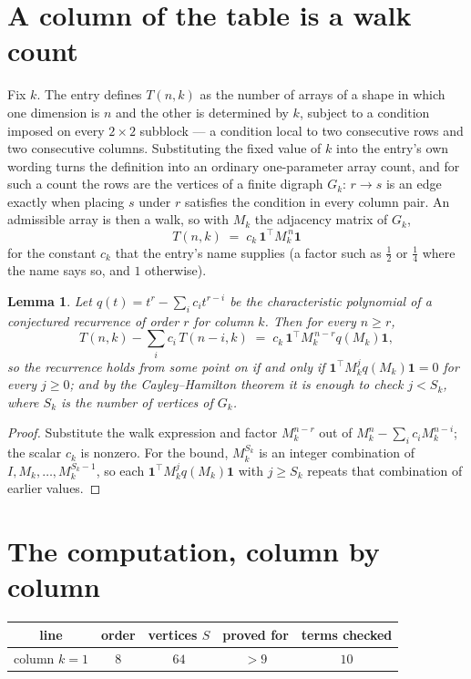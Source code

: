 \documentclass[11pt,a4paper]{article}
\theoremstyle{plain}
\newtheorem{lemma}[theorem]{Lemma}
\theoremstyle{definition}
\begin{document}
\section{A column of the table is a walk count}

Fix $k$. The entry defines $T(n,k)$ as the number of arrays of a shape in which one dimension
is $n$ and the other is determined by $k$, subject to a condition imposed on every
$2\times2$ subblock --- a condition local to two consecutive rows and two consecutive columns.
Substituting the fixed value of $k$ into the entry's own wording turns the definition into an
ordinary one-parameter array count, and for such a count the rows are the vertices of a finite
digraph $G_k$: $r\to s$ is an edge exactly when placing $s$ under $r$ satisfies the condition
in every column pair. An admissible array is then a walk, so with $M_k$ the adjacency matrix
of $G_k$,
\[
T(n,k)\;=\;c_k\,\mathbf{1}^{\!\top}M_k^{\,n}\mathbf{1}
\]
for the constant $c_k$ that the entry's name supplies (a factor such as $\tfrac12$ or
$\tfrac14$ where the name says so, and $1$ otherwise).

\begin{lemma}\label{lem:crit}
Let $q(t)=t^{r}-\sum_i c_it^{r-i}$ be the characteristic polynomial of a conjectured
recurrence of order $r$ for column $k$. Then for every $n\ge r$,
\[
T(n,k)-\sum_i c_i\,T(n-i,k)\;=\;c_k\,\mathbf{1}^{\!\top}M_k^{\,n-r}q(M_k)\mathbf{1},
\]
so the recurrence holds from some point on if and only if
$\mathbf{1}^{\!\top}M_k^{j}q(M_k)\mathbf{1}=0$ for every $j\ge0$; and by the
Cayley--Hamilton theorem it is enough to check $j<S_k$, where $S_k$ is the number of vertices
of $G_k$.
\end{lemma}

\begin{proof}
Substitute the walk expression and factor $M_k^{n-r}$ out of $M_k^{n}-\sum_ic_iM_k^{n-i}$;
the scalar $c_k$ is nonzero. For the bound, $M_k^{S_k}$ is an integer combination of
$I,M_k,\dots,M_k^{S_k-1}$, so each $\mathbf{1}^{\!\top}M_k^{j}q(M_k)\mathbf{1}$ with
$j\ge S_k$ repeats that combination of earlier values.
\end{proof}

\section{The computation, column by column}

\begin{center}
\begin{tabular}{ccccc}
line & order & vertices $S$ & proved for & terms checked \\ \hline
column $k$$=1$ & $8$ & $64$ & $>9$ & $10$ \\
\end{tabular}
\end{center}
\end{document}
